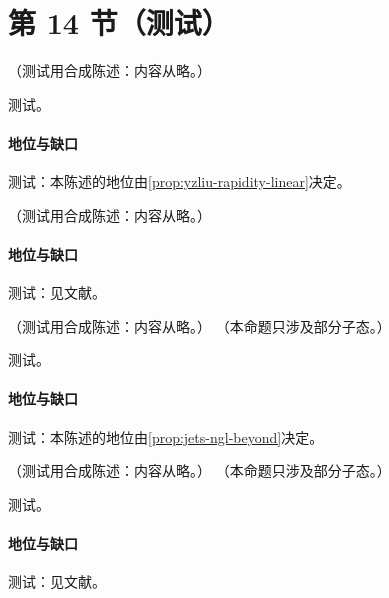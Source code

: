 \section{第 14 节（测试）}\label{sec:front-quarkonium}

\begin{proposition}\label{prop:front-rapidity-renorm}
（测试用合成陈述：内容从略。）
\end{proposition}
\begin{proofsketch}测试。\end{proofsketch}
\paragraph{地位与缺口}测试：本陈述的地位由\cref{prop:yzliu-rapidity-linear}决定。

\begin{proposition}\label{prop:front-dpd-evolution}
（测试用合成陈述：内容从略。）
\end{proposition}
\paragraph{地位与缺口}测试：见文献。

\begin{proposition}\label{prop:front-ngl}
（测试用合成陈述：内容从略。）
（本命题只涉及部分子态。）
\end{proposition}
\begin{proofsketch}测试。\end{proofsketch}
\paragraph{地位与缺口}测试：本陈述的地位由\cref{prop:jets-ngl-beyond}决定。

\begin{proposition}\label{prop:front-jet-substructure}
（测试用合成陈述：内容从略。）
（本命题只涉及部分子态。）
\end{proposition}
\begin{proofsketch}测试。\end{proofsketch}
\paragraph{地位与缺口}测试：见文献。

